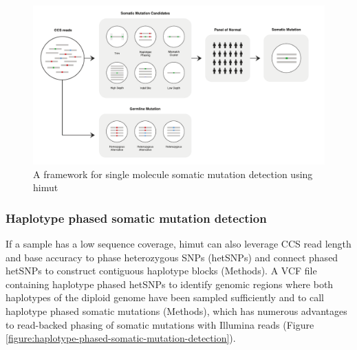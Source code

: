 \begin{figure}[htbp!]
\caption{A framework for single molecule somatic mutation detection using himut}
\label{figure:somatic-mutation-detection}
\begin{centering}
\includegraphics[width=\textwidth]{Vector/himut.pdf}
\end{centering}
\end{figure}

\pagebreak

\subsubsection{Haplotype phased somatic mutation detection}

If a sample has a low sequence coverage, himut can also leverage CCS read length and base accuracy to phase heterozygous SNPs (hetSNPs) and connect phased hetSNPs to construct contiguous haplotype blocks (Methods). A VCF file containing haplotype phased hetSNPs to identify genomic regions where both haplotypes of the diploid genome have been sampled sufficiently and to call haplotype phased somatic mutations (Methods), which has numerous advantages to read-backed phasing of somatic mutations with Illumina reads (Figure \ref{figure:haplotype-phased-somatic-mutation-detection}).

